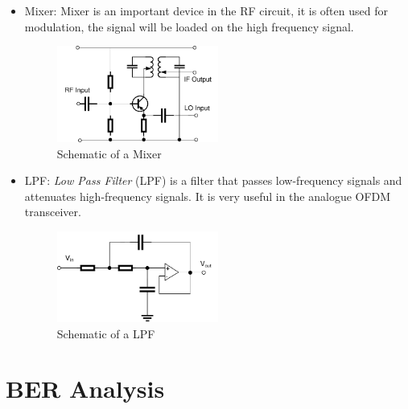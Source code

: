 \documentclass[11pt]{article}
\numberwithin{figure}{section}
\numberwithin{equation}{section}
\begin{document}
\begin{itemize}
    \item Mixer: Mixer is an important device in the RF circuit, it is often used for modulation, the signal will be loaded on the high frequency signal.
    \begin{figure}[!h]
        \centering
        \includegraphics[width=0.5\textwidth]{images/mixer.pdf}
        \caption{Schematic of a Mixer}
        \label{fig:mixer}
    \end{figure}
    \item LPF: \textit{Low Pass Filter} (LPF) is a filter that passes low-frequency signals and attenuates high-frequency signals. It is very useful in the analogue OFDM transceiver.
    \begin{figure}[!h]
        \centering
        \includegraphics[width=0.5\textwidth]{images/LPF.pdf}
        \caption{Schematic of a LPF}
        \label{fig:LPF}
    \end{figure}
\end{itemize}
\part{BER Analysis}
\end{document}

